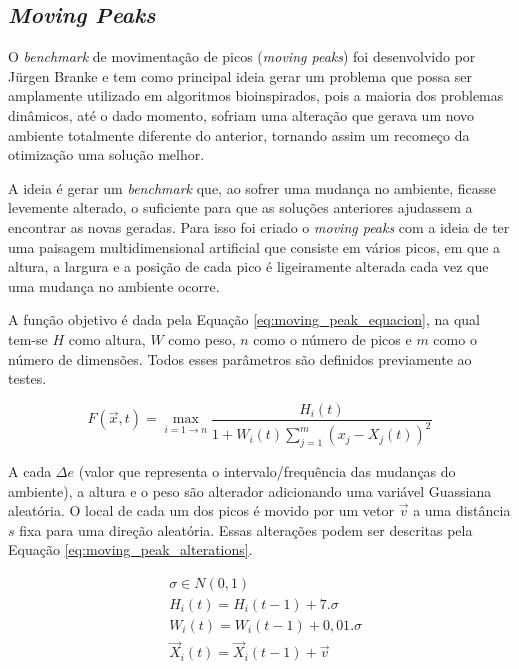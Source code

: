 \subsection{\textit{Moving Peaks}}
\label{sec:moving_peaks}

O \textit{benchmark} de movimentação de picos (\textit{moving peaks}) foi desenvolvido por Jürgen Branke \cite{moving_peak_1999} e tem como principal ideia gerar um problema que possa ser amplamente utilizado em algoritmos bioinspirados, pois a maioria dos problemas dinâmicos, até o dado momento, sofriam uma alteração que gerava um novo ambiente totalmente diferente do anterior, tornando assim um recomeço da otimização uma solução melhor.

A ideia é gerar um \textit{benchmark} que, ao sofrer uma mudança no ambiente, ficasse levemente alterado, o suficiente para que as soluções anteriores ajudassem a encontrar as novas geradas. Para isso foi criado o \textit{moving peaks} com a ideia de ter uma paisagem multidimensional artificial que consiste em vários picos, em que a altura, a largura e a posição de cada pico é ligeiramente alterada cada vez que uma mudança no ambiente ocorre.

A função objetivo é dada pela Equação \ref{eq:moving_peak_equacion}, na qual tem-se $ H $ como altura, $ W $ como peso, $ n $ como o número de picos e $ m $ como o número de dimensões. Todos esses parâmetros são definidos previamente ao testes.

\begin{equation}
\label{eq:moving_peak_equacion}
F(\vec{x},t) = \max_{i = 1 \to n} \frac {H_i(t)}{1 + W_i(t)\sum_{j=1}^{m} (x_j - X_j(t))^2}
\end{equation}

A cada $\Delta e$ (valor que representa o intervalo/frequência das mudanças do ambiente), a altura e o peso são alterador adicionando uma variável Guassiana aleatória. O local de cada um dos picos é movido por um vetor $\vec{v}$ a uma distância $ s $ fixa para uma direção aleatória. Essas alterações podem ser descritas pela Equação \ref{eq:moving_peak_alterations}.

\begin{equation}
\label{eq:moving_peak_alterations}
\begin{split}
& \sigma \in N(0,1) \\
& H_i(t) = H_i(t-1) + 7.\sigma \\
& W_i(t) = W_i(t-1) + 0,01.\sigma \\
& \vec{X}_i(t) = \vec{X}_i(t-1) + \vec{v}
\end{split}
\end{equation}

